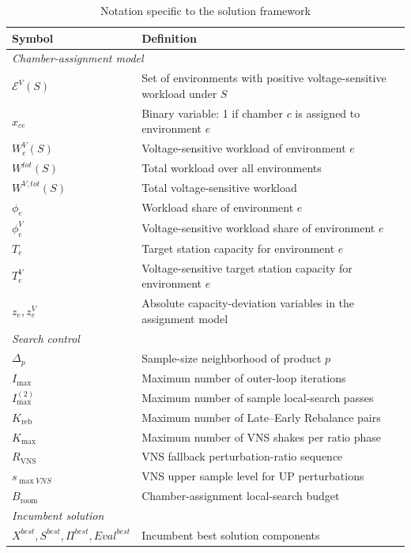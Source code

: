 \documentclass[11pt]{article}
\begin{document}
\begin{table}[H]
\centering
\caption{Notation specific to the solution framework}
\label{tab:notation_method}
\small
\setlength{\tabcolsep}{3pt}
\renewcommand{\arraystretch}{0.9}
\begin{tabular}{|l|p{}|}
\hline
\textbf{Symbol} & \textbf{Definition} \\ \hline
\multicolumn{2}{|l|}{\textit{Chamber-assignment model}} \\ \hline
\(\mathcal{E}^{V}(S)\) & Set of environments with positive voltage-sensitive workload under \(S\) \\ \hline
\(x_{ce}\) & Binary variable: 1 if chamber \(c\) is assigned to environment \(e\) \\ \hline
\(W_e^{V}(S)\) & Voltage-sensitive workload of environment \(e\) \\ \hline
\(W^{tot}(S)\) & Total workload over all environments \\ \hline
\(W^{V,tot}(S)\) & Total voltage-sensitive workload \\ \hline
\(\phi_e\) & Workload share of environment \(e\) \\ \hline
\(\phi_e^{V}\) & Voltage-sensitive workload share of environment \(e\) \\ \hline
\(T_e\) & Target station capacity for environment \(e\) \\ \hline
\(T_e^{V}\) & Voltage-sensitive target station capacity for environment \(e\) \\ \hline
\(z_e,z_e^{V}\) & Absolute capacity-deviation variables in the assignment model \\ \hline
\multicolumn{2}{|l|}{\textit{Search control}} \\ \hline
\(\Delta_p\) & Sample-size neighborhood of product \(p\) \\ \hline
\(I_{\max}\) & Maximum number of outer-loop iterations \\ \hline
\(I_{\max}^{(2)}\) & Maximum number of sample local-search passes \\ \hline
\(K_{\mathrm{reb}}\) & Maximum number of Late--Early Rebalance pairs \\ \hline
\(K_{\max}\) & Maximum number of VNS shakes per ratio phase \\ \hline
\(R_{\mathrm{VNS}}\) & VNS fallback perturbation-ratio sequence \\ \hline
\(s_{\max VNS}\) & VNS upper sample level for UP perturbations \\ \hline
\(B_{\mathrm{room}}\) & Chamber-assignment local-search budget \\ \hline
\multicolumn{2}{|l|}{\textit{Incumbent solution}} \\ \hline
\(X^{best},S^{best},\Pi^{best},Eval^{best}\) & Incumbent best solution components \\ \hline
\end{tabular}
\end{table}
\end{document}
